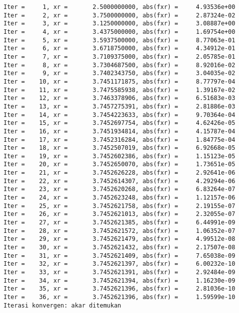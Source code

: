 \documentclass[11pt]{article}
\begin{document}
    \begin{Verbatim}[commandchars=\\\{\}]
Iter =     1, xr =       2.5000000000, abs(fxr) =     4.93536e+00
Iter =     2, xr =       3.7500000000, abs(fxr) =     2.87324e-02
Iter =     3, xr =       3.1250000000, abs(fxr) =     3.08887e+00
Iter =     4, xr =       3.4375000000, abs(fxr) =     1.69754e+00
Iter =     5, xr =       3.5937500000, abs(fxr) =     8.77063e-01
Iter =     6, xr =       3.6718750000, abs(fxr) =     4.34912e-01
Iter =     7, xr =       3.7109375000, abs(fxr) =     2.05785e-01
Iter =     8, xr =       3.7304687500, abs(fxr) =     8.92016e-02
Iter =     9, xr =       3.7402343750, abs(fxr) =     3.04035e-02
Iter =    10, xr =       3.7451171875, abs(fxr) =     8.77797e-04
Iter =    11, xr =       3.7475585938, abs(fxr) =     1.39167e-02
Iter =    12, xr =       3.7463378906, abs(fxr) =     6.51683e-03
Iter =    13, xr =       3.7457275391, abs(fxr) =     2.81886e-03
Iter =    14, xr =       3.7454223633, abs(fxr) =     9.70364e-04
Iter =    15, xr =       3.7452697754, abs(fxr) =     4.62426e-05
Iter =    16, xr =       3.7451934814, abs(fxr) =     4.15787e-04
Iter =    17, xr =       3.7452316284, abs(fxr) =     1.84775e-04
Iter =    18, xr =       3.7452507019, abs(fxr) =     6.92668e-05
Iter =    19, xr =       3.7452602386, abs(fxr) =     1.15123e-05
Iter =    20, xr =       3.7452650070, abs(fxr) =     1.73651e-05
Iter =    21, xr =       3.7452626228, abs(fxr) =     2.92641e-06
Iter =    22, xr =       3.7452614307, abs(fxr) =     4.29294e-06
Iter =    23, xr =       3.7452620268, abs(fxr) =     6.83264e-07
Iter =    24, xr =       3.7452623248, abs(fxr) =     1.12157e-06
Iter =    25, xr =       3.7452621758, abs(fxr) =     2.19155e-07
Iter =    26, xr =       3.7452621013, abs(fxr) =     2.32055e-07
Iter =    27, xr =       3.7452621385, abs(fxr) =     6.44991e-09
Iter =    28, xr =       3.7452621572, abs(fxr) =     1.06352e-07
Iter =    29, xr =       3.7452621479, abs(fxr) =     4.99512e-08
Iter =    30, xr =       3.7452621432, abs(fxr) =     2.17507e-08
Iter =    31, xr =       3.7452621409, abs(fxr) =     7.65038e-09
Iter =    32, xr =       3.7452621397, abs(fxr) =     6.00232e-10
Iter =    33, xr =       3.7452621391, abs(fxr) =     2.92484e-09
Iter =    34, xr =       3.7452621394, abs(fxr) =     1.16230e-09
Iter =    35, xr =       3.7452621396, abs(fxr) =     2.81036e-10
Iter =    36, xr =       3.7452621396, abs(fxr) =     1.59599e-10
Iterasi konvergen: akar ditemukan

    \end{Verbatim}
\end{document}

